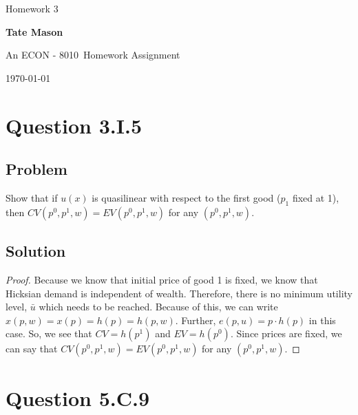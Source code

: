 \documentclass[10pt, a4paper]{article}
\newcommand\course{ECON - 8010}                            %
\newcommand\hwnumber{ 3}                                 %
\newcommand\Information{Tate Mason}                        %
\begin{document}
  \begin{titlepage}
    \begin{center}
      \vspace*{3cm}
            
        \vspace{1cm}
        \huge
        Homework \hwnumber
            
        \vspace{1.5cm}
        \Large
            
        \textbf{\Information}                      %
            
        \vfill
        
        An \course \ Homework Assignment
            
        \vspace{1cm}
        \Large

        
        \today
            
    \end{center}
  \end{titlepage}

  \newpage

  \section{Question 3.I.5}
    \subsection*{Problem}
      Show that if $u(x)$ is quasilinear with respect to the first good ($p_1$ fixed at 1), then $CV(p^0,p^1,w)=EV(p^0,p^1,w)$ for any $(p^0,p^1,w)$.
    \subsection*{Solution}
    \begin{proof}
      Because we know that initial price of good 1 is fixed, we know that Hicksian demand is independent of wealth. Therefore, there is no minimum utility level, $\bar u$ which needs to be reached. Because of this, we can write $x(p,w)=x(p)=h(p)=h(p,w)$. Further, $e(p,u) = p\cdot h(p)$ in this case. So, we see that $CV = h(p^1)$ and $EV = h(p^0)$. Since prices are fixed, we can say that $CV(p^0,p^1,w)=EV(p^0,p^1,w)$ for any $(p^0,p^1,w)$. 
    \end{proof}
  \section{Question 5.C.9}
\end{document}
